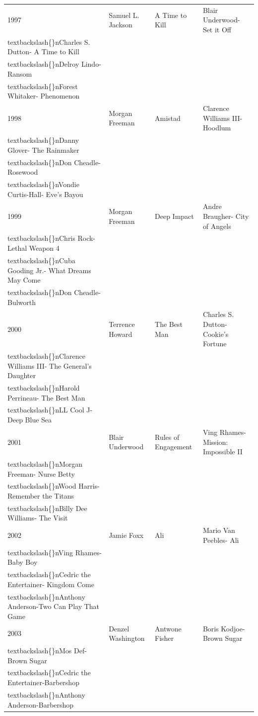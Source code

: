 \documentclass{article}
\begin{document}
\begin{tabular}{llll}
1997 & Samuel L. Jackson & A Time to Kill & Blair Underwood- Set it Off\\textbackslash\{\}nCharles S. Dutton- A Time to Kill\\textbackslash\{\}nDelroy Lindo- Ransom\\textbackslash\{\}nForest Whitaker- Phenomenon \\
1998 & Morgan Freeman & Amistad & Clarence Williams III- Hoodlum\\textbackslash\{\}nDanny Glover- The Rainmaker\\textbackslash\{\}nDon Cheadle- Rosewood\\textbackslash\{\}nVondie Curtis-Hall- Eve's Bayou \\
1999 & Morgan Freeman & Deep Impact & Andre Braugher- City of Angels\\textbackslash\{\}nChris Rock- Lethal Weapon 4\\textbackslash\{\}nCuba Gooding Jr.- What Dreams May Come\\textbackslash\{\}nDon Cheadle- Bulworth \\
2000 & Terrence Howard & The Best Man & Charles S. Dutton- Cookie's Fortune\\textbackslash\{\}nClarence Williams III- The General's Daughter\\textbackslash\{\}nHarold Perrineau- The Best Man\\textbackslash\{\}nLL Cool J- Deep Blue Sea \\
2001 & Blair Underwood & Rules of Engagement & Ving Rhames- Mission: Impossible II\\textbackslash\{\}nMorgan Freeman- Nurse Betty\\textbackslash\{\}nWood Harris- Remember the Titans\\textbackslash\{\}nBilly Dee Williams- The Visit \\
2002 & Jamie Foxx & Ali & Mario Van Peebles- Ali\\textbackslash\{\}nVing Rhames- Baby Boy\\textbackslash\{\}nCedric the Entertainer- Kingdom Come\\textbackslash\{\}nAnthony Anderson-Two Can Play That Game \\
2003 & Denzel Washington & Antwone Fisher & Boris Kodjoe-Brown Sugar\\textbackslash\{\}nMos Def-Brown Sugar\\textbackslash\{\}nCedric the Entertainer-Barbershop\\textbackslash\{\}nAnthony Anderson-Barbershop \\

\end{tabular}
\end{document}
